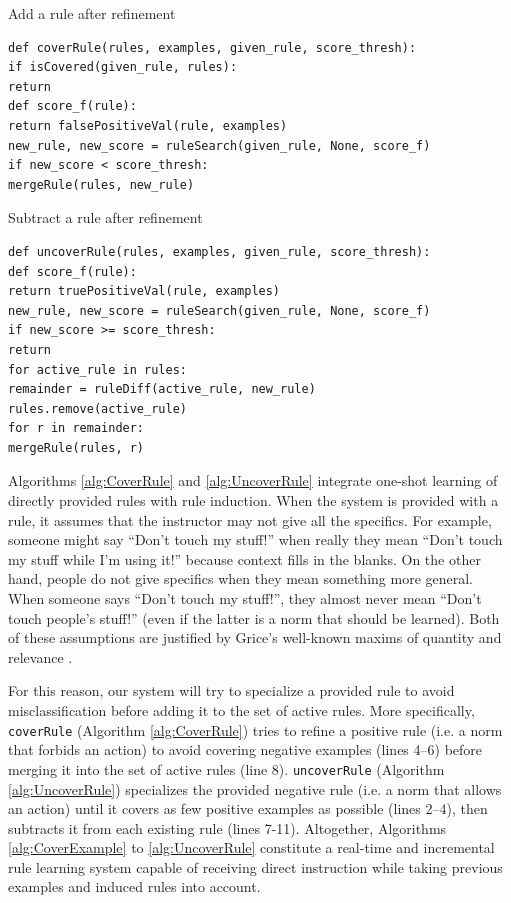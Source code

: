 \documentclass[letterpaper]{article} %
\begin{document}
\begin{algorithm}[p]
\caption{Add a rule after refinement}
\label{alg:CoverRule}
\begin{lstlisting}
def coverRule(rules, examples, given_rule, score_thresh):
if isCovered(given_rule, rules):
return
def score_f(rule):
return falsePositiveVal(rule, examples)
new_rule, new_score = ruleSearch(given_rule, None, score_f)
if new_score < score_thresh:
mergeRule(rules, new_rule)
\end{lstlisting}
\end{algorithm}

\begin{algorithm}[p]
\caption{Subtract a rule after refinement}
\label{alg:UncoverRule}
\begin{lstlisting}
def uncoverRule(rules, examples, given_rule, score_thresh):
def score_f(rule):
return truePositiveVal(rule, examples)
new_rule, new_score = ruleSearch(given_rule, None, score_f)
if new_score >= score_thresh:
return
for active_rule in rules:
remainder = ruleDiff(active_rule, new_rule)
rules.remove(active_rule)
for r in remainder:
mergeRule(rules, r)
\end{lstlisting}
\end{algorithm}

Algorithms \ref{alg:CoverRule} and \ref{alg:UncoverRule} integrate one-shot learning of directly provided rules with rule induction. When the system is provided with a rule, it assumes that the instructor may not give all the specifics. For example, someone might say ``Don't touch my stuff!'' when really they mean ``Don't touch my stuff while I'm using it!'' because context fills in the blanks. On the other hand, people do not give specifics when they mean something more general. When someone says ``Don't touch my stuff!'', they almost never mean ``Don't touch people's stuff!'' (even if the latter is a norm that should be learned). Both of these assumptions are justified by Grice's well-known maxims of quantity and relevance \cite{grice1975logic}.

For this reason, our system will try to specialize a provided rule to avoid misclassification before adding it to the set of active rules. More specifically, \texttt{\small{coverRule}} (Algorithm \ref{alg:CoverRule}) tries to refine a positive rule (i.e. a norm that forbids an action) to avoid covering negative examples (lines 4--6) before merging it into the set of active rules (line 8). \texttt{\small{uncoverRule}} (Algorithm \ref{alg:UncoverRule}) specializes the provided negative rule (i.e. a norm that allows an action) until it covers as few positive examples as possible (lines 2--4), then subtracts it from each existing rule (lines 7-11). Altogether, Algorithms \ref{alg:CoverExample} to \ref{alg:UncoverRule} constitute a real-time and incremental rule learning system capable of receiving direct instruction while taking previous examples and induced rules into account.
\end{document}
